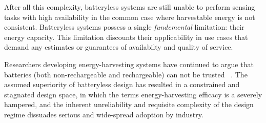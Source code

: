 After all this complexity, batteryless systems are still unable to perform sensing tasks with high availability in the common case where harvestable energy is not consistent.
Batteryless systems possess a single \textit{fundemental} limitation: their energy capacity.
This limitation discounts their applicability in use cases that demand any estimates or guarantees of availabilty and quality of service.

Researchers developing energy-harvesting systems have continued to argue that batteries (both non-rechargeable and rechargeable) can not be trusted
~\cite{hesterNew17, hesterTragedy15, hesterFlicker17, hesterTimely17, hester2017future, colinReconfigurable18, luciaIntermittent17, yervaGrafting12, majid2020continuous}.
The assumed superiority of batteryless design has resulted in a constrained and stagnated design space, in which the terms energy-harvesting efficacy is a severely hampered, and the inherent unreliability and requisite complexity of the design regime dissuades serious and wide-spread adoption by industry.

